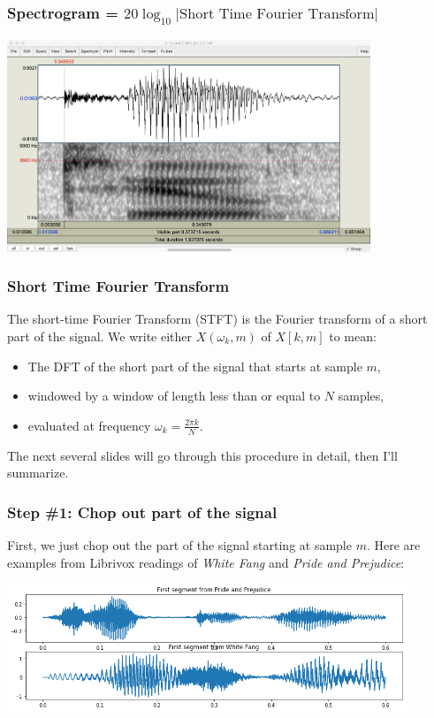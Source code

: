 \documentclass{beamer}
\begin{document}
\begin{frame}
  \frametitle{Spectrogram = $20\log_{10}|\mbox{Short Time Fourier Transform}|$}
  \centerline{\includegraphics[height=2.5in]{CM05_B2_D2_M4.png}}
\end{frame}

\begin{frame}
  \frametitle{Short Time Fourier Transform}


  The short-time Fourier Transform (STFT) is the Fourier transform of
  a short part of the signal.
  We write either $X(\omega_k,m)$  of $X[k,m]$ to mean:
  \begin{itemize}
  \item The DFT of the short part of the signal that starts at sample $m$,
  \item windowed by a window of length less than or equal to $N$ samples,
  \item evaluated at frequency $\omega_k=\frac{2\pi k}{N}$.
  \end{itemize}
  The next several slides will go through this procedure in detail,
  then I'll summarize.
\end{frame}

\begin{frame}
  \frametitle{Step \#1: Chop out part of the signal}

  First, we just chop out the part of the signal starting at sample
  $m$.  Here are examples from Librivox readings of {\em White Fang}
  and {\em Pride and Prejudice}:
  \centerline{\includegraphics[height=1.5in]{librivox_waves.png}}
\end{frame}
\end{document}

